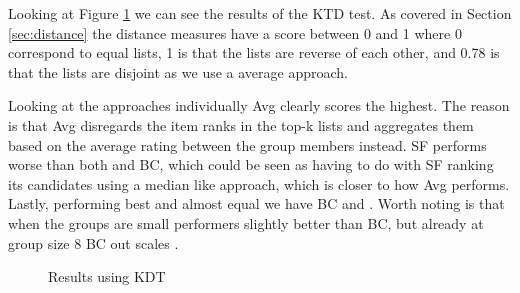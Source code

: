 Looking at Figure \ref{fig:kendalldistance} we can see the results of the KTD test. As covered in Section \ref{sec:distance} the distance measures have a score between 0 and 1 where 0 correspond to equal lists, 1 is that the lists are reverse of each other, and 0.78 is that the lists are disjoint as we use a average approach.

Looking at the approaches individually Avg clearly scores the highest. The reason is that Avg disregards the item ranks in the top-k lists and aggregates them based on the average rating between the group members instead. SF performs worse than both \MC and BC, which could be seen as having to do with SF ranking its candidates using a median like approach, which is closer to how Avg performs. Lastly, performing best and almost equal we have BC and \MC. Worth noting is that when the groups are small \MC performers slightly better than BC, but already at group size 8 BC out scales \MC.

\begin{figure}[H]
\caption{Results using KDT} \label{fig:kendalldistance}
\end{figure}

